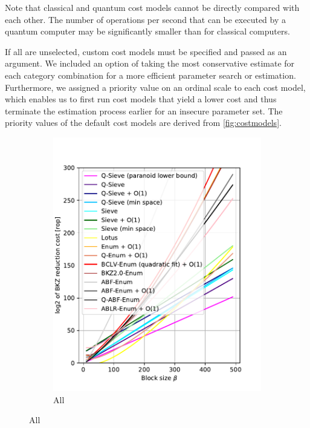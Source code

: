 Note that classical and quantum cost models cannot be directly compared with each other. The number of operations per second that can be executed by a quantum computer may be significantly smaller than for classical computers. %

If all are unselected, custom cost models must be specified and passed as an argument. We included an option of taking the most conservative estimate for each category combination for a more efficient parameter search or estimation. Furthermore, we assigned a priority value on an ordinal scale to each cost model, which enables us to first run cost models that yield a lower cost and thus terminate the estimation process earlier for an insecure parameter set. The priority values of the default cost models are derived from \cref{fig:costmodels}.
\begin{figure}[h!]
    \centering
    \begin{subfigure}{0.5\textwidth}
        \centering
        \includegraphics[width=1\textwidth]{graphics/cost_models.pdf}
        \caption{All}
    \end{subfigure}

\end{figure}

